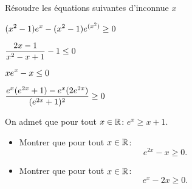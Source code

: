 \documentclass[a4paper, 11pt]{article}
\newcommand{\subscript}[2]{$#1 _ #2$}
\begin{document}
\begin{exercice}

Résoudre les équations suivantes d'inconnue $x$
\vspace{0.4cm}
    \begin{enumerate}[label=(\subscript{T}{{\arabic*}}) : $\,$]
\hspace{1cm}
\begin{minipage}{0.5\textwidth}
        \item $ \displaystyle  (x^2-1)e^{x} - (x^2-1)e^{(x^2)}\geq 0$\\
        \item $\displaystyle  \frac{2x-1}{x^2-x+1}-1\leq 0$
    \end{minipage}
    \begin{minipage}{0.5\textwidth}
        \item $  \displaystyle xe^{x} - x \leq 0$\\
        \item $ \displaystyle \frac{e^{x}(e^{2x}+1) - e^x(2e^{2x})}{(e^{2x}+1)^2}\geq 0$
    \end{minipage}

\end{enumerate}
\end{exercice}
\vspace{0.4cm}
\begin{exercice}
    On admet que pour tout $x\in \mathbb{R}$: $e^{x}\geq x+1$. 
   \begin{itemize}
       \item  Montrer que pour tout $x\in \mathbb{R}$: $$e^{2x}-x\geq 0.$$
    \item  Montrer que pour tout $x\in \mathbb{R}$: $$e^{x}-2x\geq 0.$$
    
   \end{itemize} 
    
\end{exercice}
\end{document}
